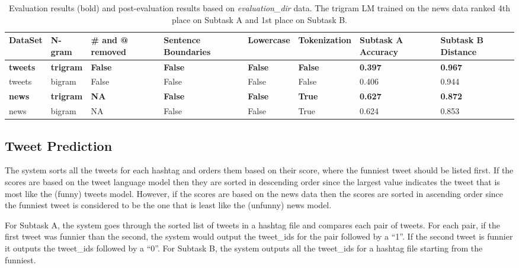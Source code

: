 \documentclass[11pt,a4paper]{article}
\begin{document}
\begin{table*}[h!]
\centering
\begin{tabular}{ |p{1.2cm}|p{1.2cm}|p{1.2cm}|p{1.7cm}|p{1.5cm}|p{1.9cm}|p{1.7cm}|p{1.7cm}|}
\hline
DataSet & N-gram & \# and @ removed  & Sentence Boundaries & Lowercase & Tokenization & Subtask A Accuracy & Subtask B Distance \\
\hline
\textbf{tweets} & \textbf{trigram} & \textbf{False} & \textbf{False} & \textbf{False} & \textbf{False} & \textbf{0.397} & \textbf{0.967} \\
\hline
tweets & bigram & False & False & False & False & 0.406 & 0.944 \\
\hline
\textbf{news} & \textbf{trigram} & \textbf{NA} & \textbf{False} & \textbf{False} & \textbf{True} & \textbf{0.627} & \textbf{0.872} \\
\hline
news & bigram & NA & False & False & True & 0.624 & 0.853 \\
\hline
\end{tabular}
\caption{Evaluation results (bold) and post-evaluation results based on \textit{evaluation\_dir} data. The trigram LM trained on the news data ranked 4th place on Subtask A and 1st place on Subtask B.}
\label{table:3}
\end{table*}

\subsection{Tweet Prediction}

The system sorts all the tweets for each hashtag and orders them based on their
score, where the funniest tweet should be listed first. If the scores are based
on the tweet language model then they are sorted in descending order since the
largest value indicates the tweet that is most like the (funny) tweets model. 
However,
if the scores are based on the news data then the scores are sorted in ascending
order since the funniest tweet is considered to be the one that is least like 
the (unfunny) news model.

For Subtask A, the system goes through the sorted list of tweets in a hashtag file
and compares each pair of tweets. For each pair, if the first tweet was funnier 
than the second, the system would output the tweet\_ids for the pair 
followed by a ``1''. If the second tweet is funnier it outputs the tweet\_ids 
followed by a ``0''. For Subtask B, the system outputs all the tweet\_ids for
a hashtag file starting from the funniest. 
\end{document}
